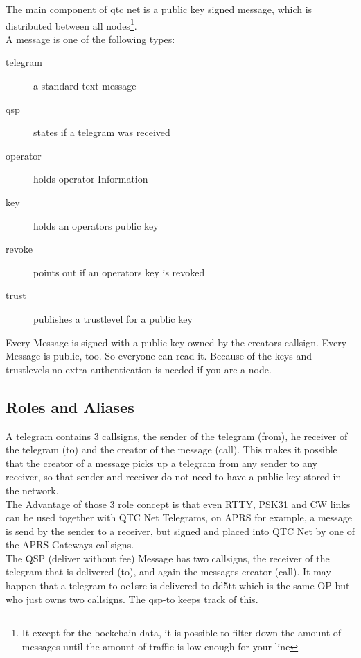 \documentclass{article}
\begin{document}
The main component of qtc net is a public key signed message, which is
distributed between all nodes\footnote{It except for the bockchain data, 
it is possible to filter down the amount of messages until the amount 
of traffic is low enough for your line}.\\

A message is one of the following types: 

\begin{description}
	\item[telegram] a standard text message
	\item[qsp] states if a telegram was received
	\item[operator] holds operator Information
	\item[key] holds an operators public key
	\item[revoke] points out if an operators key is revoked
	\item[trust] publishes a trustlevel for a public key
\end{description}


Every Message is signed with a public key owned by the creators callsign. 
Every Message is public, too. So everyone can read it. Because of the keys 
and trustlevels no extra authentication is needed if you are a node. \\

\subsection{Roles and Aliases}

A telegram contains 3 callsigns, the sender of the telegram (from), he 
receiver of the telegram (to) and the creator of the message (call). This 
makes it possible that the creator of a message picks up a telegram from any 
sender to any receiver, so that sender and receiver do not need to have a 
public key stored in the network.\\

The Advantage of those 3 role concept is that even RTTY, PSK31 and CW links 
can be used together with QTC Net Telegrams, on APRS for example, a message 
is send by the sender to a receiver, but signed and placed into QTC Net by 
one of the APRS Gateways callsigns.\\ 

The QSP (deliver without fee) Message has two callsigns, the receiver of 
the telegram that is delivered (to), and again the messages creator (call). It
may happen that a telegram to oe1src is delivered to dd5tt which is the same OP
but who just owns two callsigns. The qsp-to keeps track of this. \\
\end{document}
